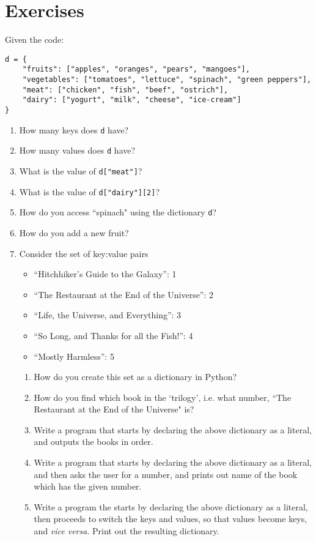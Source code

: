 \section{Exercises}

Given the code:
\begin{lstlisting}
d = {
    "fruits": ["apples", "oranges", "pears", "mangoes"],
    "vegetables": ["tomatoes", "lettuce", "spinach", "green peppers"],
    "meat": ["chicken", "fish", "beef", "ostrich"],
    "dairy": ["yogurt", "milk", "cheese", "ice-cream"]
}\end{lstlisting}
\begin{enumerate}
	\item How many keys does \texttt{d} have?
	\item How many values does \texttt{d} have?
	\item What is the value of 
\texttt{d["meat"]}?
	\item What is the value of 
\texttt{d["dairy"][2]}?
	\item How do you access ``spinach" using the dictionary \texttt{d}?
	\item How do you add a new fruit?
	\item Consider the set of key:value pairs
\begin{itemize}
	\item ``Hitchhiker's Guide to the Galaxy'': 1
	\item ``The Restaurant at the End of the Universe'': 2
	\item ``Life, the Universe, and Everything'': 3
	\item ``So Long, and Thanks for all the Fish!'': 4
	\item ``Mostly Harmless'': 5
\end{itemize}
\begin{enumerate}
	\item How do you create this set as a dictionary in      Python?
	\item How do you find which book in the `trilogy', i.e. what      number, ``The Restaurant at the End of the Universe"      is?
	\item Write a program that starts by declaring the above      dictionary as a literal, and outputs the books in      order.
	\item Write a program that starts by declaring the above      dictionary as a literal, and then asks the user for a      number, and prints out name of the book which has the given      number.
	\item Write a program the starts by declaring the above      dictionary as a literal, then proceeds to switch the keys      and values, so that values become keys, and \textit{vice      versa}.  Print out the resulting dictionary.

\end{enumerate}
\end{enumerate}

